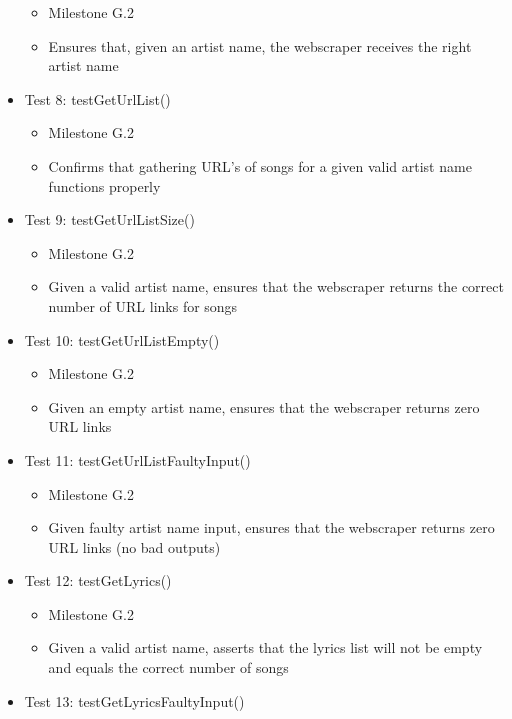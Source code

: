 \documentclass[]{article}
\begin{document}
\begin{itemize}
  \begin{itemize}
  \itemsep1pt\parskip0pt
  \item
    Milestone G.2
  \item
    Ensures that, given an artist name, the webscraper receives the
    right artist name
  \end{itemize}
\item
  Test 8: testGetUrlList()

  \begin{itemize}
  \itemsep1pt\parskip0pt
  \item
    Milestone G.2
  \item
    Confirms that gathering URL's of songs for a given valid artist name
    functions properly
  \end{itemize}
\item
  Test 9: testGetUrlListSize()

  \begin{itemize}
  \itemsep1pt\parskip0pt
  \item
    Milestone G.2
  \item
    Given a valid artist name, ensures that the webscraper returns the
    correct number of URL links for songs
  \end{itemize}
\item
  Test 10: testGetUrlListEmpty()

  \begin{itemize}
  \itemsep1pt\parskip0pt
  \item
    Milestone G.2
  \item
    Given an empty artist name, ensures that the webscraper returns zero
    URL links
  \end{itemize}
\item
  Test 11: testGetUrlListFaultyInput()

  \begin{itemize}
  \itemsep1pt\parskip0pt
  \item
    Milestone G.2
  \item
    Given faulty artist name input, ensures that the webscraper returns
    zero URL links (no bad outputs)
  \end{itemize}
\item
  Test 12: testGetLyrics()

  \begin{itemize}
  \itemsep1pt\parskip0pt
  \item
    Milestone G.2
  \item
    Given a valid artist name, asserts that the lyrics list will not be
    empty and equals the correct number of songs
  \end{itemize}
\item
  Test 13: testGetLyricsFaultyInput()


\end{itemize}
\end{document}

